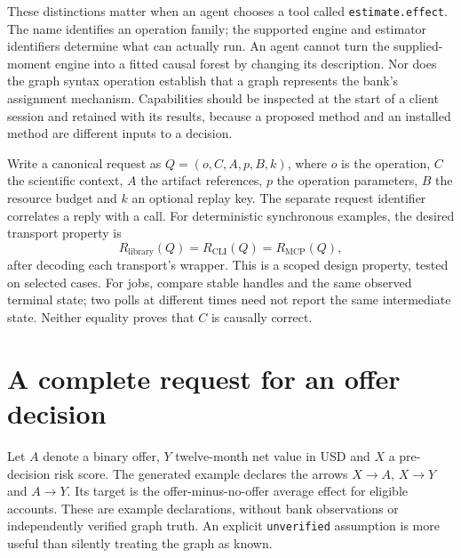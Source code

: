These distinctions matter when an agent chooses a tool called
\texttt{estimate.effect}. The name identifies an operation family; the supported
engine and estimator identifiers determine what can actually run. An agent
cannot turn the supplied-moment engine into a fitted causal forest by changing
its description. Nor does the graph syntax operation establish that a graph
represents the bank's assignment mechanism. Capabilities should be inspected
at the start of a client session and retained with its results, because a
proposed method and an installed method are different inputs to a decision.

Write a canonical request as $Q=(o,C,A,p,B,k)$, where $o$ is the operation,
$C$ the scientific context, $A$ the artifact references, $p$ the operation
parameters, $B$ the resource budget and $k$ an optional replay key. The separate
request identifier correlates a reply with a call. For deterministic synchronous
examples, the desired transport property is
\[
 R_{\mathrm{library}}(Q)=R_{\mathrm{CLI}}(Q)
 =R_{\mathrm{MCP}}(Q),
\]
after decoding each transport's wrapper. This is a scoped design property,
tested on selected cases. For jobs, compare stable handles and the same
observed terminal state; two polls at different times need not report the same
intermediate state. Neither equality proves that $C$ is causally correct.

\section{A complete request for an offer decision}

Let $A$ denote a binary offer, $Y$ twelve-month net value in USD and $X$ a
pre-decision risk score. The generated example declares the arrows
$X\to A$, $X\to Y$ and $A\to Y$. Its target is the offer-minus-no-offer average
effect for eligible accounts. These are example declarations, without bank
observations or independently verified graph truth. An explicit
\texttt{unverified} assumption is more useful than silently treating the graph
as known.

